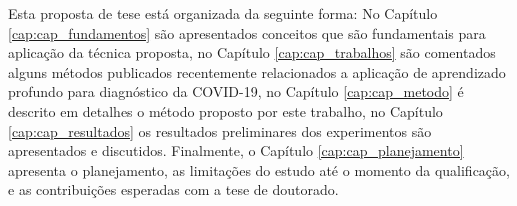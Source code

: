 Esta proposta de tese está organizada da seguinte forma: No  Capítulo \ref{cap:cap_fundamentos}  são apresentados conceitos que são fundamentais para aplicação da técnica proposta, no Capítulo \ref{cap:cap_trabalhos} são comentados alguns métodos publicados recentemente relacionados a aplicação de aprendizado profundo para diagnóstico da COVID-19, no Capítulo \ref{cap:cap_metodo} é descrito em detalhes o método proposto por este trabalho, no Capítulo \ref{cap:cap_resultados} os resultados preliminares dos experimentos são apresentados e discutidos. Finalmente, o Capítulo \ref{cap:cap_planejamento} apresenta o planejamento, as limitações do estudo até o momento da qualificação, e as contribuições esperadas com a tese de doutorado.







